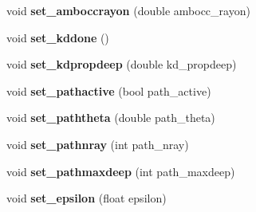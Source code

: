 \begin{DoxyCompactItemize}
\item 
\hypertarget{class_parametres_a5e947f26065405848f81daab4f5776b8}{
void {\bfseries set\_\-amboccrayon} (double ambocc\_\-rayon)}
\label{class_parametres_a5e947f26065405848f81daab4f5776b8}

\item 
\hypertarget{class_parametres_afb0e12a70eb75b0130e2916ad09561a3}{
void {\bfseries set\_\-kddone} ()}
\label{class_parametres_afb0e12a70eb75b0130e2916ad09561a3}

\item 
\hypertarget{class_parametres_a4016ae48aeccb8b1d301a86a9524357f}{
void {\bfseries set\_\-kdpropdeep} (double kd\_\-propdeep)}
\label{class_parametres_a4016ae48aeccb8b1d301a86a9524357f}

\item 
\hypertarget{class_parametres_ae90dda8e314e35eee52a471d0f510666}{
void {\bfseries set\_\-pathactive} (bool path\_\-active)}
\label{class_parametres_ae90dda8e314e35eee52a471d0f510666}

\item 
\hypertarget{class_parametres_ac1c443e33d67bc68228fcf19d1f4b5ec}{
void {\bfseries set\_\-paththeta} (double path\_\-theta)}
\label{class_parametres_ac1c443e33d67bc68228fcf19d1f4b5ec}

\item 
\hypertarget{class_parametres_a07bf0583a9d332493a6f78b652954743}{
void {\bfseries set\_\-pathnray} (int path\_\-nray)}
\label{class_parametres_a07bf0583a9d332493a6f78b652954743}

\item 
\hypertarget{class_parametres_a528f6b2771b80c7383caea140382ce2f}{
void {\bfseries set\_\-pathmaxdeep} (int path\_\-maxdeep)}
\label{class_parametres_a528f6b2771b80c7383caea140382ce2f}

\item 
\hypertarget{class_parametres_a92c94f1a5c3626acad645f3066b84854}{
void {\bfseries set\_\-epsilon} (float epsilon)}
\label{class_parametres_a92c94f1a5c3626acad645f3066b84854}

\end{DoxyCompactItemize}

